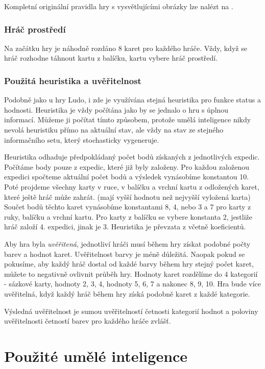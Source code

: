 Kompletní originální pravidla hry s vysvětlujícími obrázky lze nalézt na \cite{Neni}.

\subsubsection{Hráč prostředí}

Na začátku hry je náhodně rozdáno 8 karet pro každého hráče. Vždy, když se hráč rozhodne táhnout kartu z balíčku, kartu vybere hráč prostředí.

\subsubsection{Použitá heuristika a uvěřitelnost}

Podobně jako u hry Ludo, i zde je využívána stejná heuristika pro funkce status a hodnosti. Heuristika je vždy počítána jako by se jednalo o hru s úplnou informací. Můžeme ji počítat tímto způsobem, protože umělá inteligence nikdy nevolá heuristiku přímo na aktuální stav, ale vždy na stav ze stejného informačního setu, který stochasticky vygeneruje.

Heuristika odhaduje předpokládaný počet bodů získaných z jednotlivých expedic. Počítáme body pouze z expedic, které již byly založeny. Pro každou založenou expedici spočteme aktuální počet bodů a výsledek vynásobíme konstantou 10. Poté projdeme všechny karty v ruce, v balíčku a vrchní kartu z odložených karet, které ještě hráč může zahrát. (mají vyšší hodnotu než nejvyšší vyložená karta) Součet bodů těchto karet vynásobíme konstantami 8, 4, nebo 3 a 7 pro karty z ruky, balíčku a vrchní kartu. Pro karty z balíčku se vybere konstanta 2, jestliže hráč založí 4. expedici, jinak je 3. Heuristika je převzata z \cite{ch5LT} včetně koeficientů.

Aby hra byla \emph{uvěřitená}, jednotliví hráči musí během hry získat podobné počty barev a hodnot karet. Uvěřitelnost barvy je méně důležitá. Naopak pokud se pokusíme, aby každý hráč dostal od každé barvy během hry stejný počet karet, můžete to negativně ovlivnit průběh hry. Hodnoty karet rozdělíme do 4 kategorií - sázkové karty, hodnoty 2, 3, 4, hodnoty 5, 6, 7 a nakonec 8, 9, 10. Hra bude více uvěřitelná, když každý hráč během hry získá podobně karet z každé kategorie.

Výsledná uvěřitelnost je sumou uvěřitelností četnosti kategorií hodnot a poloviny uvěřitelnosti četností barev pro každého hráče zvlášť.

\section{Použité umělé inteligence}

